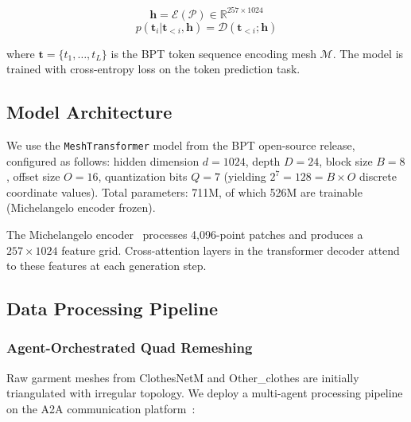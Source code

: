 \documentclass[conference]{IEEEtran}
\begin{document}
\begin{equation}
\mathbf{h} = \mathcal{E}(\mathcal{P}) \in \mathbb{R}^{257 \times 1024}
\end{equation}
\begin{equation}
p(\mathbf{t}_i | \mathbf{t}_{<i}, \mathbf{h}) = \mathcal{D}(\mathbf{t}_{<i}; \mathbf{h})
\end{equation}

where $\mathbf{t} = \{t_1, \ldots, t_L\}$ is the BPT token sequence encoding mesh $\mathcal{M}$.
The model is trained with cross-entropy loss on the token prediction task.

\subsection{Model Architecture}

We use the \texttt{MeshTransformer} model from the BPT open-source release, configured as follows:
hidden dimension $d = 1024$, depth $D = 24$, block size $B = 8$, offset size $O = 16$, quantization bits $Q = 7$ (yielding $2^7 = 128 = B \times O$ discrete coordinate values).
Total parameters: 711M, of which 526M are trainable (Michelangelo encoder frozen).

The Michelangelo encoder~\cite{michelangelo2023} processes 4,096-point patches and produces a $257 \times 1024$ feature grid.
Cross-attention layers in the transformer decoder attend to these features at each generation step.

\subsection{Data Processing Pipeline}

\subsubsection{Agent-Orchestrated Quad Remeshing}

Raw garment meshes from ClothesNetM and Other\_clothes are initially triangulated with irregular topology.
We deploy a multi-agent processing pipeline on the A2A communication platform~\cite{yang2026a2a}:
\end{document}
